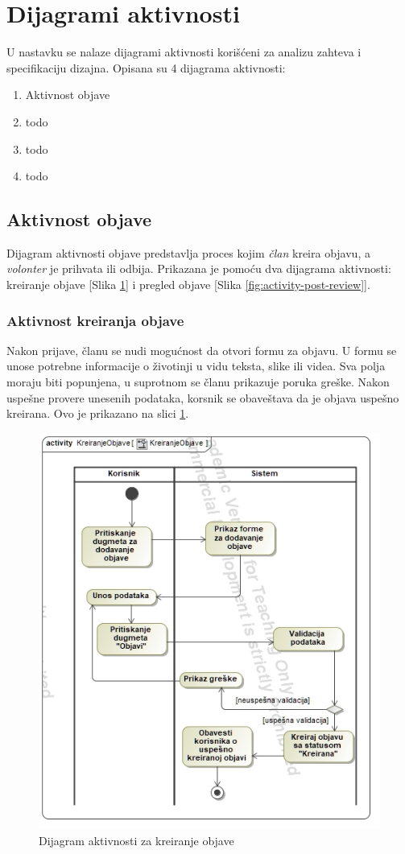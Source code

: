 \section{Dijagrami aktivnosti}
\par U nastavku se nalaze dijagrami aktivnosti korišćeni za analizu zahteva i specifikaciju dizajna.
Opisana su 4 dijagrama aktivnosti:
\begin{enumerate}
    \item Aktivnost objave
    \item todo
    \item todo
    \item todo
\end{enumerate}
\subsection{Aktivnost objave}
\par Dijagram aktivnosti objave predstavlja proces kojim \textit{član} kreira objavu, a \textit{volonter} je prihvata ili odbija.
Prikazana je pomoću dva dijagrama aktivnosti: kreiranje objave [Slika \ref{fig:activity-create-post}] i pregled objave [Slika \ref{fig:activity-post-review}].
\subsubsection*{Aktivnost kreiranja objave}
\par Nakon prijave, članu se nudi mogućnost da otvori formu za objavu. U formu se unose potrebne informacije o životinji u vidu teksta, slike ili videa.
Sva polja moraju biti popunjena, u suprotnom se članu prikazuje poruka greške. Nakon uspešne provere unesenih podataka, korsnik se obaveštava da je 
objava uspešno kreirana. Ovo je prikazano na slici \ref{fig:activity-create-post}.
\begin{figure}[h]
    \centering
    \includegraphics[width=\textwidth, height=0.75\textwidth]{img/activity-create-post.jpg}
    \caption{Dijagram aktivnosti za kreiranje objave}
    \label{fig:activity-create-post}
\end{figure}
